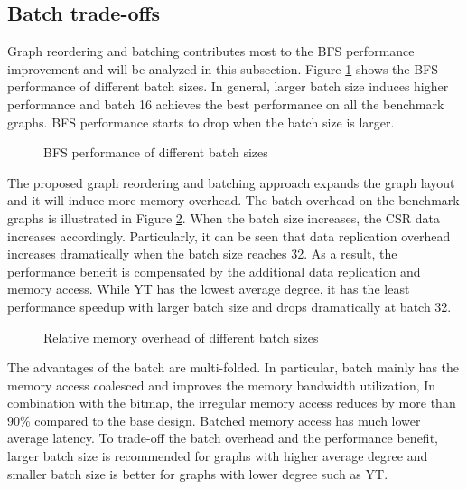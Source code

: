 \subsection{Batch trade-offs}
Graph reordering and batching contributes most to the BFS performance 
improvement and will be analyzed in this subsection. 
Figure \ref{fig:batch-perf} shows the BFS performance of different batch sizes.
In general, larger batch size induces higher performance and batch 16 
achieves the best performance on all the benchmark graphs. BFS performance 
starts to drop when the batch size is larger.  
\begin{figure}
    \caption{BFS performance of different batch sizes}
\label{fig:batch-perf}
\vspace{-1em}
\end{figure}


The proposed graph reordering and batching approach expands the 
graph layout and it will induce more memory overhead. The batch overhead 
on the benchmark graphs is illustrated in Figure \ref{fig:batch-overhead}. 
When the batch size increases, the CSR data increases accordingly. 
Particularly, it can be seen that data replication overhead 
increases dramatically when the batch size reaches 32. 
As a result, the performance benefit is compensated 
by the additional data replication and memory access.
While YT has the lowest average degree, it has the least performance 
speedup with larger batch size and drops dramatically at batch 32.

\begin{figure}
    \caption{Relative memory overhead of different batch sizes}
\label{fig:batch-overhead}
\vspace{-1em}
\end{figure}

The advantages of the batch are multi-folded.
In particular, batch mainly has the memory 
access coalesced and improves the memory bandwidth utilization, 
In combination with the bitmap, the irregular memory access 
reduces by more than 90\% compared to the base design.
Batched memory access has much lower average latency. 
To trade-off the batch overhead and the performance benefit, 
larger batch size is recommended for graphs with higher average degree 
and smaller batch size is better for graphs with lower degree 
such as YT.  


